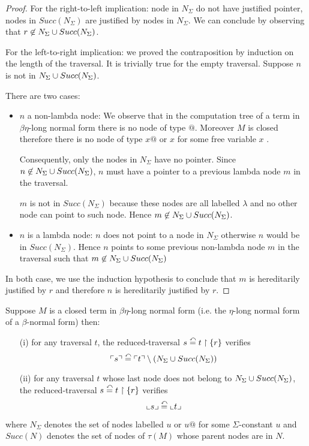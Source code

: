 \begin{proof}
For the right-to-left implication: node in $N_\Sigma$ do not have justified pointer, nodes
in $Succ(N_\Sigma)$ are justified by nodes in $N_\Sigma$. We can conclude by observing that $r \not\in N_\Sigma \cup Succ(N_\Sigma)$.

For the left-to-right implication: we proved the contraposition by induction on the length of the traversal.
It is trivially true for the empty traversal.
Suppose $n$ is not in $N_\Sigma \cup Succ(N_\Sigma)$.

There are two cases:
\begin{itemize}
\item $n$ a non-lambda node:
We observe that in the computation tree of a term in $\beta \eta$-long normal form
there is no node of type $@$. Moreover $M$ is closed therefore there is no node of type $x@$ or $x$ for some
free variable  $x$ .

Consequently, only the nodes in $N_\Sigma$ have no pointer.
Since $n \not\in N_\Sigma \cup Succ(N_\Sigma)$, $n$ must have a pointer to a previous lambda node $m$ in the traversal.

$m$ is not in $Succ(N_\Sigma)$ because these nodes are all labelled $\lambda$ and no other node can point to such node.
Hence $m\not\in N_\Sigma \cup Succ(N_\Sigma)$.

\item $n$ is a lambda node:
$n$ does not point to a node in $N_\Sigma$ otherwise $n$ would be in $Succ(N_\Sigma)$. Hence $n$ points to some
previous non-lambda node $m$ in the traversal such that $m\not\in N_\Sigma \cup Succ(N_\Sigma)$
\end{itemize}
In both case, we use the induction hypothesis to conclude that $m$ is hereditarily justified by $r$ and
therefore $n$ is hereditarily justified by $r$.
\end{proof}

\begin{lem}
\label{lem:redtrav_trav}
Suppose $M$ is a closed term in $\beta \eta$-long normal form (i.e. the $\eta$-long normal form of a $\beta$-normal form) then:
\begin{itemize}
\item[(i)] for any traversal $t$, the reduced-traversal $s \stackrel{\curvearrowleft}{=} t \upharpoonright \{ r \}$ verifies
$$ \ulcorner s \urcorner \stackrel{\curvearrowleft}{=} \ulcorner t \urcorner \setminus \left( N_\Sigma \cup Succ(N_\Sigma) \right)$$
\item[(ii)] for any traversal $t$ whose last node does not belong to $N_\Sigma \cup Succ(N_\Sigma)$,
     the reduced-traversal $s \stackrel{\curvearrowleft}{=} t \upharpoonright \{ r \}$ verifies
    $$ \llcorner s \lrcorner \stackrel{\curvearrowleft}{=} \llcorner t \lrcorner$$
\end{itemize}

where $N_\Sigma$ denotes the set of nodes labelled $u$ or $u@$ for some
$\Sigma$-constant $u$ and $Succ(N)$ denotes the set of nodes of $\tau(M)$ whose parent nodes are
in $N$.
\end{lem}

